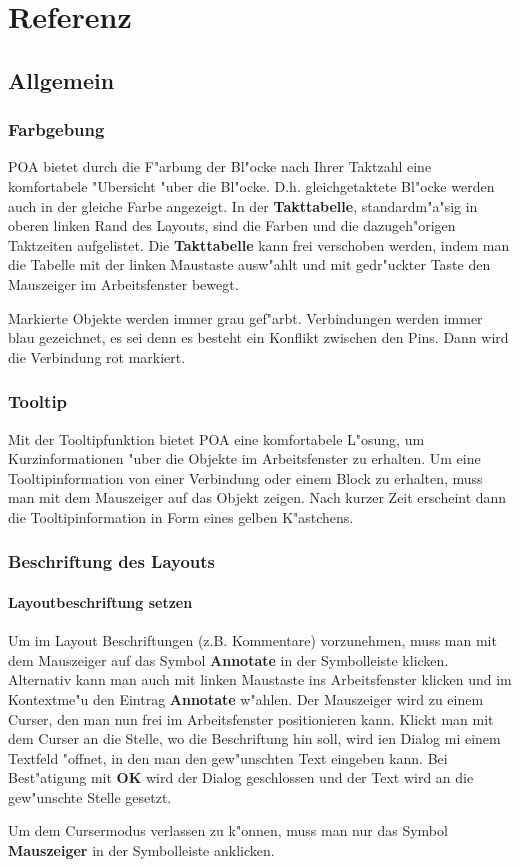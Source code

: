 \documentclass[a4paper,titlepage,12pt,ngerman]{scrbook}
\begin{document}
\chapter{Referenz}

\section{Allgemein}
\subsection{Farbgebung}
POA bietet durch die F"arbung der Bl"ocke nach Ihrer Taktzahl eine komfortabele "Ubersicht "uber die Bl"ocke. D.h. gleichgetaktete Bl"ocke werden auch in der gleiche Farbe angezeigt.\newline
In der {\bf Takttabelle}, standardm"a"sig in oberen linken Rand des Layouts, sind die Farben und die dazugeh"origen Taktzeiten aufgelistet. Die {\bf Takttabelle} kann frei verschoben werden, indem man die Tabelle mit der linken Maustaste ausw"ahlt und mit gedr"uckter Taste den Mauszeiger im Arbeitsfenster bewegt.\par
Markierte Objekte werden immer grau gef"arbt.\newline
Verbindungen werden immer blau gezeichnet, es sei denn es besteht ein Konflikt zwischen den Pins. Dann wird die Verbindung rot markiert.


\subsection{Tooltip}
Mit der Tooltipfunktion bietet POA eine komfortabele L"osung, um Kurzinformationen "uber die Objekte im Arbeitsfenster zu erhalten. Um eine Tooltipinformation von einer Verbindung oder einem Block zu erhalten, muss man mit dem Mauszeiger auf das Objekt zeigen. Nach kurzer Zeit erscheint dann die Tooltipinformation in Form eines gelben K"astchens.

\subsection{Beschriftung des Layouts}
\subsubsection{Layoutbeschriftung setzen}
Um im Layout Beschriftungen (z.B. Kommentare) vorzunehmen, muss man mit dem Mauszeiger auf das Symbol {\bf Annotate} in der Symbolleiste klicken. Alternativ kann man auch mit linken Maustaste ins Arbeitsfenster klicken und im Kontextme"u den Eintrag {\bf Annotate} w"ahlen. Der Mauszeiger wird zu einem Curser, den man nun frei im Arbeitsfenster positionieren kann. Klickt man mit dem Curser an die Stelle, wo die Beschriftung hin soll, wird ien Dialog mi einem Textfeld "offnet, in den man den gew"unschten Text eingeben kann. Bei Best"atigung mit {\bf OK} wird der Dialog geschlossen und der Text wird an die gew"unschte Stelle gesetzt.\par
Um dem Cursermodus verlassen zu k"onnen, muss man nur das Symbol {\bf Mauszeiger} in der Symbolleiste anklicken.
\end{document}

